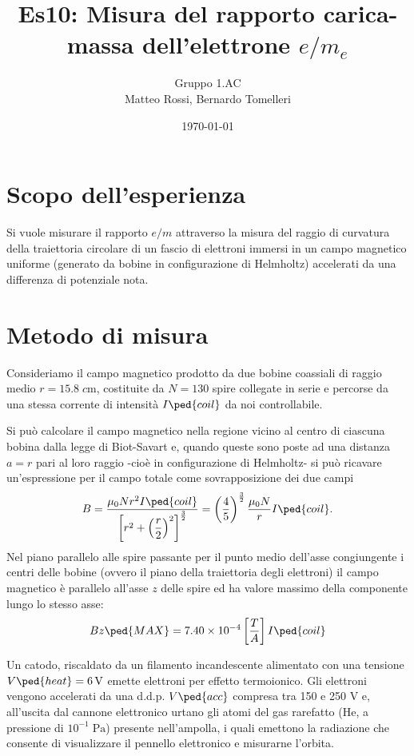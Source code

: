 \documentclass[10pt, a4paper, italian]{article}
\author{Gruppo 1.AC \\ Matteo Rossi, Bernardo Tomelleri}
\title{Es10: Misura del rapporto carica-massa dell'elettrone $e/m_e$}
\begin{document}
\date{\today}
\maketitle

\section{Scopo dell'esperienza}
Si vuole misurare il rapporto $e/m$ attraverso la misura del raggio di
curvatura della traiettoria circolare di un fascio di elettroni immersi in un
campo magnetico uniforme (generato da bobine in configurazione di Helmholtz)
accelerati da una differenza di potenziale nota.

\section{Metodo di misura}
Consideriamo il campo magnetico prodotto da due bobine coassiali di raggio
medio $r = 15.8 \; \si{c\m}$, costituite da $N = 130$ spire collegate in
serie e percorse da una stessa corrente di intensità $I\ped{coil}$ da noi
controllabile.

Si può calcolare il campo magnetico nella regione vicino al centro di ciascuna
bobina dalla legge di Biot-Savart e, quando queste sono poste ad una distanza
$a = r$ pari al loro raggio -cioè in configurazione di Helmholtz- si può
ricavare un'espressione per il campo totale come sovrapposizione dei due campi
\begin{equation}\label{eq: B-helm}
    B = \frac{\mu_0 N r^2 I\ped{coil}}{\left[r^2 + \left(\dfrac{r}{2}\right)^2
    \right]^\frac{3}{2}} =
    \left(\frac{4}{5}\right)^{\frac{3}{2}} \frac{\mu_{0} N}{r} I\ped{coil}.
\end{equation}
Nel piano parallelo alle spire passante per il punto medio dell'asse
congiungente i centri delle bobine (ovvero il piano della traiettoria degli
elettroni) il campo magnetico è parallelo all'asse $z$ delle spire ed ha
valore massimo della componente lungo lo stesso asse:
\begin{equation}\label{eq: Bmax}
Bz\ped{MAX} = 7.40 \times 10^{-4} \left[\frac{T}{A}\right] I\ped{coil}
\end{equation}

Un catodo, riscaldato da un filamento incandescente alimentato con una
tensione $V\ped{heat} = \SI{6}{\V}$ emette elettroni per effetto termoionico.
Gli elettroni vengono accelerati da una d.d.p. $V\ped{acc}$ compresa tra 150
e 250 V e, all'uscita dal cannone elettronico urtano gli atomi del gas
rarefatto (He, a pressione di $10^{-1} \; \si{\Pa}$) presente nell'ampolla,
i quali emettono la radiazione che consente di visualizzare il pennello elettronico e
misurarne l'orbita.
\end{document}
